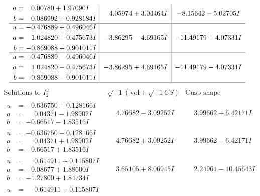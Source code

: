 \documentclass[1p]{elsarticle_modified}
\theoremstyle{definition}
\newcommand{\I}{\sqrt{-1}}
\begin{document}
$$\begin{array}{c|c|c}
\begin{aligned}
a &= \phantom{-}0.00780 + 1.97090 I \\
b &= \phantom{-}0.086992 + 0.928184 I\end{aligned}
 & \phantom{-}4.05974 + 3.04464 I & -8.15642 - 5.02705 I \\ \hline\begin{aligned}
u &= -0.476889 + 0.496046 I \\
a &= \phantom{-}1.024820 + 0.475673 I \\
b &= -0.869088 + 0.901011 I\end{aligned}
 & -3.86295 - 4.69165 I & -11.49179 + 4.07331 I \\ \hline\begin{aligned}
u &= -0.476889 - 0.496046 I \\
a &= \phantom{-}1.024820 - 0.475673 I \\
b &= -0.869088 - 0.901011 I\end{aligned}
 & -3.86295 + 4.69165 I & -11.49179 - 4.07331 I\\
 \hline 
 \end{array}$$\newpage$$\begin{array}{c|c|c}  
\text{Solutions to }I^u_{2}& \I (\text{vol} + \sqrt{-1}CS) & \text{Cusp shape}\\
 \hline 
\begin{aligned}
u &= -0.636750 + 0.128166 I \\
a &= \phantom{-}0.04371 - 1.98902 I \\
b &= -0.66517 - 1.83516 I\end{aligned}
 & \phantom{-}4.76682 - 3.09252 I & \phantom{-}3.99662 + 6.42171 I \\ \hline\begin{aligned}
u &= -0.636750 - 0.128166 I \\
a &= \phantom{-}0.04371 + 1.98902 I \\
b &= -0.66517 + 1.83516 I\end{aligned}
 & \phantom{-}4.76682 + 3.09252 I & \phantom{-}3.99662 - 6.42171 I \\ \hline\begin{aligned}
u &= \phantom{-}0.614911 + 0.115807 I \\
a &= -0.08677 + 1.88600 I \\
b &= -1.27800 + 1.84734 I\end{aligned}
 & \phantom{-}3.65105 + 8.06945 I & \phantom{-}2.24961 - 10.45643 I \\ \hline\begin{aligned}
u &= \phantom{-}0.614911 - 0.115807 I \\

\end{aligned}
\end{array}$$
\end{document}
